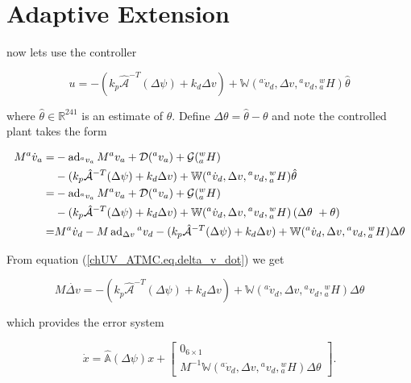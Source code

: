 
\section{Adaptive Extension}

now lets use the controller 

\begin{equation}
u=-(k_p\hat{\mathcal{A}}^{-T}(\Delta \psi)+k_d\Delta v)
+\mathbb{W}({^a}\dot{v}_d,\Delta v, {^a}v_d , {^w_a}H)\hat{\theta}
\end{equation}

where $\hat{\theta}\in\mathbb{R}^{241}$ is an estimate of $\theta$.
Define $\Delta \theta=\hat{\theta} - \theta$ and note the controlled
plant takes the form

\begin{align}
  M{^a}\dot{v}_a=
     &-\operatorname{ad}_{{^a}v_a}M{^a}v_a+\mathcal{D}({^a}v_a)+\mathcal{G}({^w_a}H)
\nonumber \\ 
     &-(k_p\hat{\mathcal{A}}^{-T}(\Delta \psi)+k_d\Delta v)
+\mathbb{W}({^a}\dot{v}_d,\Delta v, {^a}v_d , {^w_a}H)\hat{\theta}
\nonumber \\
    =&-\operatorname{ad}_{{^a}v_a}M{^a}v_a+\mathcal{D}({^a}v_a)+\mathcal{G}({^w_a}H)
\nonumber \\ 
     &-(k_p\hat{\mathcal{A}}^{-T}(\Delta \psi)+k_d\Delta v)
+\mathbb{W}({^a}\dot{v}_d,\Delta v, {^a}v_d ,
{^w_a}H)\left(\Delta \theta\ + \theta \right)
\nonumber \\
    =&M{^a}\dot{v}_d - M\operatorname{ad}_{\Delta v}{^a}v_d
      -(k_p\hat{\mathcal{A}}^{-T}(\Delta \psi)+k_d\Delta v)
      +\mathbb{W}({^a}\dot{v}_d,\Delta v, {^a}v_d ,
      {^w_a}H)\Delta \theta
\nonumber 
\end{align}

\noindent From equation (\ref{chUV_ATMC.eq.delta_v_dot}) we get

\begin{equation}\label{chUV_AMTC.eq.Mdelta_v_dot_adapt}
M \dot{\Delta v} = -(k_p\hat{\mathcal{A}}^{-T}(\Delta \psi)+k_d\Delta
v) +\mathbb{W}({^a}\dot{v}_d,\Delta v, {^a}v_d ,
      {^w_a}H)\Delta \theta
\end{equation}

\noindent which provides the error system

\begin{equation}
\dot{x}=\hat{\mathbb{A}}(\Delta \psi) x +
\left[\begin{array}{c}
   0_{6\times 1}   \\ M^{-1}\mathbb{W}({^a}\dot{v}_d,\Delta v, {^a}v_d ,
      {^w_a}H)\Delta \theta
   \end{array} \right]. 
\end{equation}

